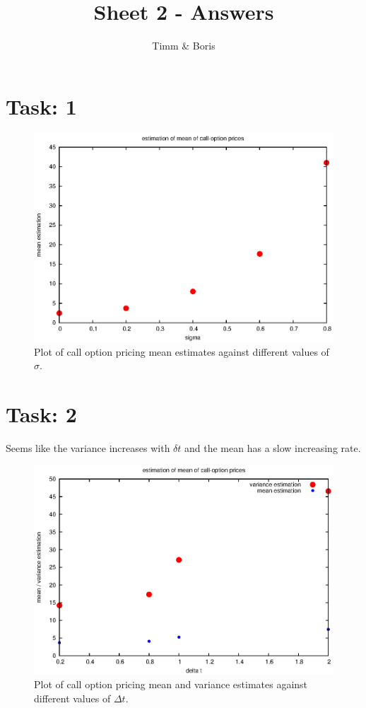\documentclass{article}
\title{Sheet 2 - Answers}
\author{Timm \& Boris}
\begin{document}
\maketitle

\section*{Task: 1}

\begin{figure}[htbp]
  \centering
    \includegraphics[width=1.0\textwidth]{../Task01/sh2_task1_mean_estimates_plot.eps}
			\caption{Plot of call option pricing mean estimates against different values of $\sigma$.}
\end{figure}

\newpage
\section*{Task: 2}
Seems like the variance increases with $\delta t$ and the mean has a slow increasing rate.

\begin{figure}[htbp]
  \centering
     \includegraphics[width=1.0\textwidth]{../Task02/sh2_task2_variance_estimates_plot.eps}
   \caption{Plot of call option pricing mean and variance estimates against different values of $\Delta t$.}
\end{figure}
\end{document}
